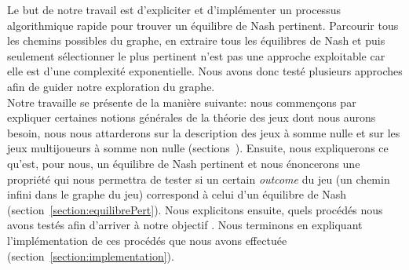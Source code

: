 Le but de notre travail est d'expliciter et d'implémenter un processus algorithmique rapide pour trouver un équilibre de Nash pertinent. Parcourir tous les chemins possibles du graphe, en extraire tous les équilibres de Nash et puis seulement sélectionner le plus pertinent n'est pas une approche exploitable car elle est d'une complexité exponentielle. Nous avons donc testé plusieurs approches afin de guider notre exploration du graphe.\\


Notre travaille se présente de la manière suivante: nous commençons par expliquer certaines notions générales de la théorie des jeux dont nous aurons besoin, nous nous attarderons sur la description des jeux à somme nulle et sur les jeux multijoueurs à somme non nulle (sections~). Ensuite, nous expliquerons ce qu'est, pour nous, un équilibre de Nash pertinent et nous énoncerons une propriété qui nous permettra de tester si un certain \emph{outcome} du jeu (un chemin infini dans le graphe du jeu) correspond à celui d'un équilibre de Nash (section~\ref{section:equilibrePert}). Nous explicitons ensuite, quels procédés nous avons testés afin d'arriver à notre objectif . Nous terminons en expliquant l'implémentation de ces procédés que nous avons effectuée (section~\ref{section:implementation}).
